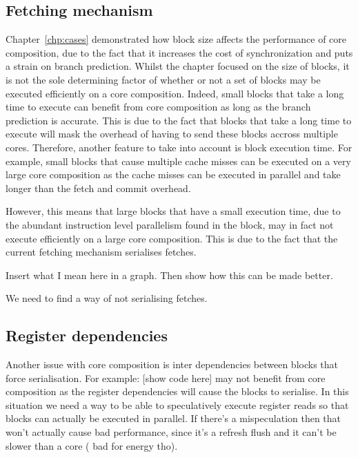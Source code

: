 \subsection{Fetching mechanism}
Chapter~\ref{chp:cases} demonstrated how block size affects the performance of core composition, due to the fact that it increases the cost of synchronization and puts a strain on branch prediction.
Whilst the chapter focused on the size of blocks, it is not the sole determining factor of whether or not a set of blocks may be executed efficiently on a core composition.
Indeed, small blocks that take a long time to execute can benefit from core composition as long as the branch prediction is accurate.
This is due to the fact that blocks that take a long time to execute will mask the overhead of having to send these blocks accross multiple cores.
Therefore, another feature to take into account is block execution time.
For example, small blocks that cause multiple cache misses can be executed on a very large core composition as the cache misses can be executed in parallel and take longer than the fetch and commit overhead.

However, this means that large blocks that have a small execution time, due to the abundant instruction level parallelism found in the block, may in fact not execute efficiently on a large core composition.
This is due to the fact that the current fetching mechanism serialises fetches.

Insert what I mean here in a graph.
Then show how this can be made better.

We need to find a way of not serialising fetches.


\subsection{Register dependencies}
Another issue with core composition is inter dependencies between blocks that force serialisation.
For example: [show code here] may not benefit from core composition as the register dependencies will cause the blocks to serialise.
In this situation we need a way to be able to speculatively execute register reads so that blocks can actually be executed in parallel.
If there's a mispeculation then that won't actually cause bad performance, since it's a refresh flush and it can't be slower than a core ( bad for energy tho).